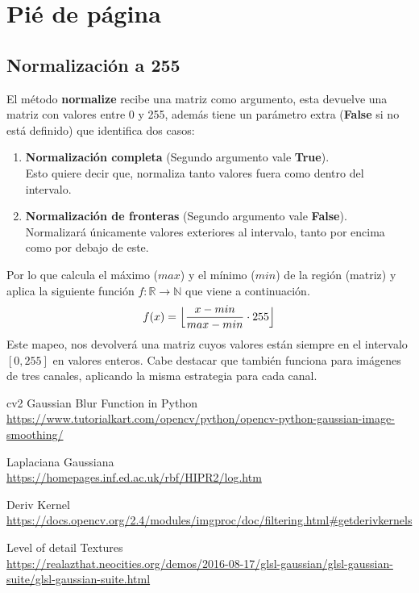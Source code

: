\documentclass{article}
\begin{document}
\newpage

\section{Pié de página}

\subsection{Normalización a 255}
El método \textbf{normalize} recibe una matriz como argumento, esta devuelve una matriz con valores entre 0 y 255, además tiene un parámetro extra (\textbf{False} si no está definido) que identifica dos casos:
\begin{enumerate}
	\item \textbf{Normalización completa} (Segundo argumento vale \textbf{True}).\\ Esto quiere decir que, normaliza tanto valores fuera como dentro del intervalo.
	\item \textbf{Normalización de fronteras} (Segundo argumento vale \textbf{False}). \\ Normalizará únicamente valores exteriores al intervalo, tanto por encima como por debajo de este.
\end{enumerate}
Por lo que calcula el máximo ($max$) y el mínimo ($min$) de la región (matriz) y aplica la siguiente función $f:\mathbb{R} \to \mathbb{N}$ que viene a continuación.
$$ f(x) = \Bigl\lfloor\dfrac{x - min}{max - min} \cdot 255\Bigr\rfloor$$
Este mapeo, nos devolverá una matriz cuyos valores están siempre en el intervalo $\left[0, 255\right]$ en valores enteros.
Cabe destacar que también funciona para imágenes de tres canales, aplicando la misma estrategia para cada canal.


\newpage

\begin{thebibliography}{9}
	cv2 Gaussian Blur Function in Python \\
	\url{https://www.tutorialkart.com/opencv/python/opencv-python-gaussian-image-smoothing/}
	
	Laplaciana Gaussiana\\
	\url{https://homepages.inf.ed.ac.uk/rbf/HIPR2/log.htm}
	
	Deriv Kernel \\
	\url{https://docs.opencv.org/2.4/modules/imgproc/doc/filtering.html#getderivkernels}
	
	Level of detail Textures \\
	\url{https://realazthat.neocities.org/demos/2016-08-17/glsl-gaussian/glsl-gaussian-suite/glsl-gaussian-suite.html}
	
\end{thebibliography}
\end{document}
